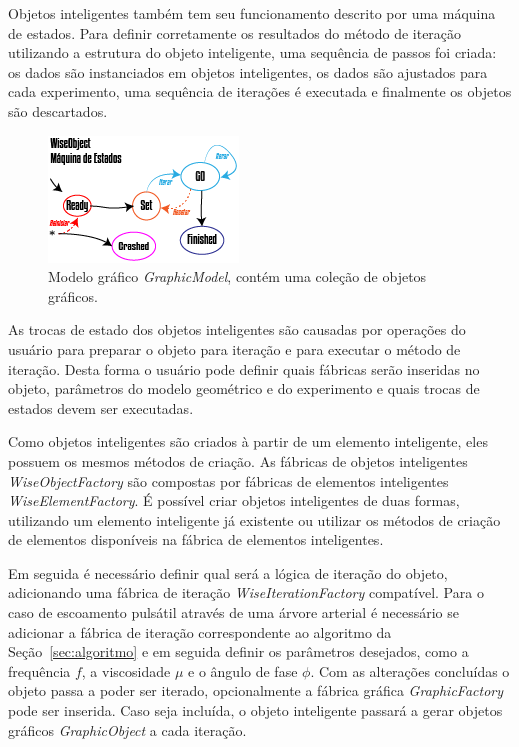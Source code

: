 \documentclass[
        english,			
        brazil			        %
        ,<...>]{abntbibufjf}
\begin{document}
Objetos inteligentes também tem seu funcionamento descrito por uma máquina de estados. Para definir corretamente os resultados do método de iteração utilizando a estrutura do objeto inteligente, uma sequência de passos foi criada: os dados são instanciados em objetos inteligentes, os dados são ajustados para cada experimento, uma sequência de iterações é executada e finalmente os objetos são descartados.

\begin{figure}[!htbp]
	\centering
	\includegraphics[scale=1]{Figures/WiseObjectStatus.png}
	\caption{Modelo gráfico \textit{GraphicModel}, contém uma coleção de objetos gráficos.}
	\label{fig7:wiseobjectstatuses}
\end{figure}

As trocas de estado dos objetos inteligentes são causadas por operações do usuário para preparar o objeto para iteração e para executar o método de iteração. Desta forma o usuário pode definir quais fábricas serão inseridas no objeto, parâmetros do modelo geométrico e do experimento e quais trocas de estados devem ser executadas.

Como objetos inteligentes são criados à partir de um elemento inteligente, eles possuem os mesmos métodos de criação. As fábricas de objetos inteligentes \textit{WiseObjectFactory} são compostas por fábricas de elementos inteligentes \textit{WiseElementFactory}. É possível criar objetos inteligentes de duas formas, utilizando um elemento inteligente já existente ou utilizar os métodos de criação de elementos disponíveis na fábrica de elementos inteligentes.

Em seguida é necessário definir qual será a lógica de iteração do objeto, adicionando uma fábrica de iteração \textit{WiseIterationFactory} compatível. Para o caso de escoamento pulsátil através de uma árvore arterial é necessário se adicionar a fábrica de iteração correspondente ao algoritmo da Seção~\ref{sec:algoritmo} e em seguida definir os parâmetros desejados, como a frequência $f$, a viscosidade $\mu$ e o ângulo de fase $\phi$. Com as alterações concluídas o objeto passa a poder ser iterado, opcionalmente a fábrica gráfica \textit{GraphicFactory} pode ser inserida. Caso seja incluída, o objeto inteligente passará a gerar objetos gráficos \textit{GraphicObject} a cada iteração.
\end{document}
